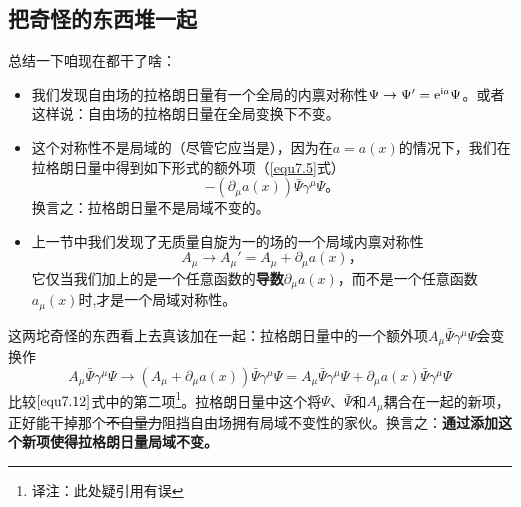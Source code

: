 \subsection{把奇怪的东西堆一起}\label{sec7.1.3}
总结一下咱现在都干了啥：
\begin{itemize}
\item 我们发现\spint 自由场的拉格朗日量有一个全局的内禀对称性$\Psi\rightarrow\Psi' = \mathrm e^{\mathrm i a}\Psi$。或者这样说：\spint 自由场的拉格朗日量在全局\uo 变换下不变。
\item 这个对称性不是局域的（尽管它应当是），因为在$a=a(x)$的情况下，我们在拉格朗日量中得到如下形式的额外项（\eqref{equ7.5}式）
\begin{equation}
-(\partial_\mu a(x))\bar\Psi\gamma^\mu\Psi \text{。}
\label{equ7.12}
\end{equation}
换言之：拉格朗日量不是局域\uo 不变的。
\item 上一节中我们发现了无质量自旋为一的场的一个局域内禀对称性
\begin{equation}
A_\mu \rightarrow A_\mu' = A_\mu +\partial_\mu a(x) \text{，}
\label{equ7.13}
\end{equation}
它仅当我们加上的是一个任意函数的{\bfseries 导数}$\partial_\mu a(x)$，而不是一个任意函数$a_\mu(x)$时,才是一个局域对称性。
\end{itemize}
这两坨奇怪的东西看上去真该加在一起：拉格朗日量中的一个额外项$A_\mu\bar\Psi\gamma^\mu\Psi$会变换作
\begin{equation}
\label{equ7.14}
A_\mu\bar\Psi\gamma^\mu\Psi \rightarrow (A_\mu+\partial_\mu a(x))\bar\Psi\gamma^\mu\Psi = A_\mu\bar\Psi\gamma^\mu\Psi + \partial_\mu a(x)\bar\Psi\gamma^\mu\Psi
\end{equation}
比较$\eqref{equ7.12}$式中的第二项\footnote{译注：此处疑引用有误}。拉格朗日量中这个将$\Psi$、$\bar\Psi$和$A_\mu$耦合在一起的新项，正好能干掉那个\sout{不自量力}阻挡\spint 自由场拥有局域\uo 不变性的家伙。换言之：{\bfseries 通过添加这个新项使得拉格朗日量局域\uo 不变。}

